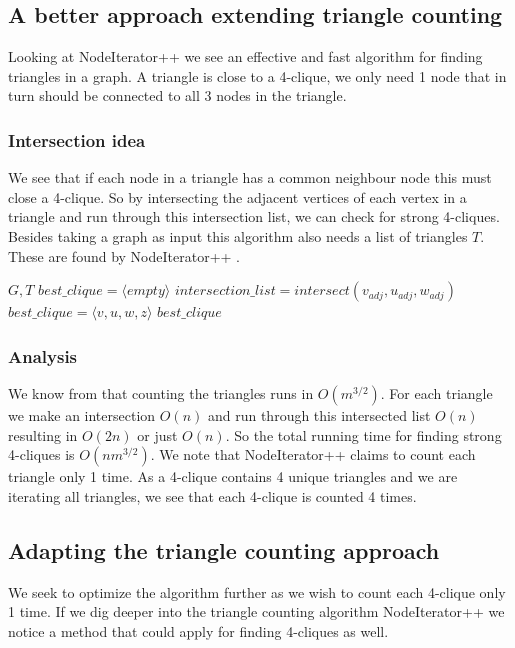 \documentclass{article}
\begin{document}
\subsection{A better approach extending triangle counting}
Looking at NodeIterator++ \cite{countingTriangles} we see an effective and fast algorithm for finding triangles in a graph. A triangle is close to a 4-clique, we only need 1 node that in turn should be connected to all 3 nodes in the triangle.

\subsubsection{Intersection idea}
We see that if each node in a triangle has a common neighbour node this must close a 4-clique. So by intersecting the adjacent vertices of each vertex in a triangle and run through this intersection list, we can check for strong 4-cliques. Besides taking a graph as input this algorithm also needs a list of triangles $T$. These are found by NodeIterator++ \cite{countingTriangles}.

\begin{algorithm}
\label{strong_clique_p}
\caption{$strong\_4clique\_finder+$}
\begin{algorithmic}
\REQUIRE $G,T$
\STATE $best\_clique = \langle empty\rangle $
	\STATE $intersection\_list = intersect(v_{adj}, u_{adj}, w_{adj})$
				\STATE $best\_clique = \langle v,u,w,z\rangle $
			\ENDIF
		\ENDFOR
	\ENDIF
\ENDFOR
\RETURN $best\_clique$
\end{algorithmic}
\end{algorithm}

\subsubsection{Analysis}
We know from \cite{countingTriangles} that counting the triangles runs in $O(m^{3/2})$. For each triangle we make an intersection $O(n)$ and run through this intersected list $O(n)$ resulting in $O(2n)$ or just $O(n)$. So the total running time for finding strong 4-cliques is $O(nm^{3/2})$. We note that NodeIterator++ claims to count each triangle only 1 time. As a 4-clique contains 4 unique triangles and we are iterating all triangles, we see that each 4-clique is counted 4 times.

\subsection{Adapting the triangle counting approach}
We seek to optimize the algorithm further as we wish to count each 4-clique only 1 time. If we dig deeper into the triangle counting algorithm NodeIterator++ \cite{countingTriangles} we notice a method that could apply for finding 4-cliques as well.
\end{document}
